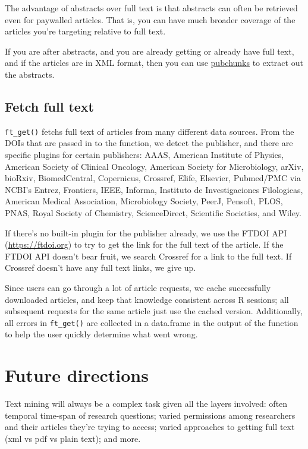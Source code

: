 \documentclass[author-year, review, 11pt]{components/elsarticle} %
\begin{document}
The advantage of abstracts over full text is that abstracts can often be
retrieved even for paywalled articles. That is, you can have much
broader coverage of the articles you're targeting relative to full text.

If you are after abstracts, and you are already getting or already have
full text, and if the articles are in XML format, then you can use
\href{https://github.com/ropensci/pubchunks}{pubchunks} to extract out
the abstracts.

\hypertarget{fetch-full-text}{%
\subsection{Fetch full text}\label{fetch-full-text}}

\texttt{ft\_get()} fetchs full text of articles from many different data
sources. From the DOIs that are passed in to the function, we detect the
publisher, and there are specific plugins for certain publishers: AAAS,
American Institute of Physics, American Society of Clinical Oncology,
American Society for Microbiology, arXiv, bioRxiv, BiomedCentral,
Copernicus, Crossref, Elife, Elsevier, Pubmed/PMC via NCBI's Entrez,
Frontiers, IEEE, Informa, Instituto de Investigaciones Filologicas,
American Medical Association, Microbiology Society, PeerJ, Pensoft,
PLOS, PNAS, Royal Society of Chemistry, ScienceDirect, Scientific
Societies, and Wiley.

If there's no built-in plugin for the publisher already, we use the
FTDOI API (\url{https://ftdoi.org}) to try to get the link for the full
text of the article. If the FTDOI API doesn't bear fruit, we search
Crossref for a link to the full text. If Crossref doesn't have any full
text links, we give up.

Since users can go through a lot of article requests, we cache
successfully downloaded articles, and keep that knowledge consistent
across R sessions; all subsequent requests for the same article just use
the cached version. Additionally, all errors in \texttt{ft\_get()} are
collected in a data.frame in the output of the function to help the user
quickly determine what went wrong.

\hypertarget{future-directions}{%
\section{Future directions}\label{future-directions}}

Text mining will always be a complex task given all the layers involved:
often temporal time-span of research questions; varied permissions among
researchers and their articles they're trying to access; varied
approaches to getting full text (xml vs pdf vs plain text); and more.
\end{document}
